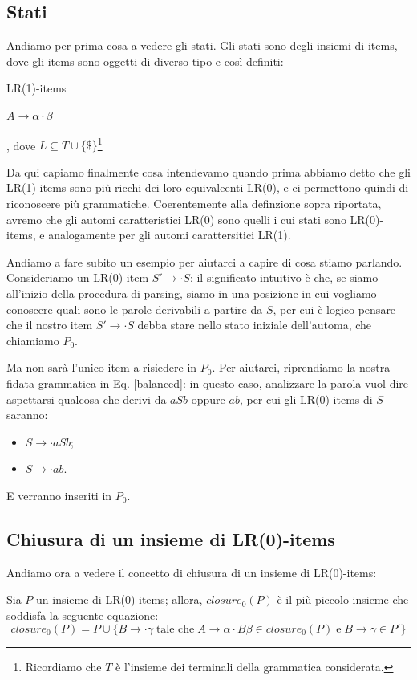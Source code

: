 \documentclass[class=book, crop=false, oneside, 12pt]{standalone}
\begin{document}
\subsection{Stati}
Andiamo per prima cosa a vedere gli stati. Gli stati sono degli insiemi di items, dove gli items sono oggetti di diverso tipo e così definiti:
\begin{labeling}{LR(1)-items}
    \item[LR(0)-items] \(A \to \alpha \cdot \beta\)
    \item[LR(1)-items] [\(A \to \alpha \cdot \beta, L\)], dove \(L \subseteq T \cup \{\$\}\)\footnote{Ricordiamo che \(T\) è l'insieme dei terminali della grammatica considerata.}
\end{labeling}
Da qui capiamo finalmente cosa intendevamo quando prima abbiamo detto che gli LR(1)-items sono più ricchi dei loro equivaleenti LR(0), e ci permettono quindi di riconoscere più grammatiche. Coerentemente alla definzione sopra riportata, avremo che gli automi caratteristici LR(0) sono quelli i cui stati sono LR(0)-items, e analogamente per gli automi carattersitici LR(1).

Andiamo a fare subito un esempio per aiutarci a capire di cosa stiamo parlando. Consideriamo un LR(0)-item \(S' \to \cdot S\): il significato intuitivo è che, se siamo all'inizio della procedura di parsing, siamo in una posizione in cui vogliamo conoscere quali sono le parole derivabili a partire da \(S\), per cui è logico pensare che il nostro item \(S' \to \cdot S\) debba stare nello stato iniziale dell'automa, che chiamiamo \(P_0\).

Ma non sarà l'unico item a risiedere in \(P_0\). Per aiutarci, riprendiamo la nostra fidata grammatica in Eq. \ref{balanced}: in questo caso, analizzare la parola vuol dire aspettarsi qualcosa che derivi da \(aSb\) oppure \(ab\), per cui gli LR(0)-items di \(S\) saranno:
\begin{itemize}
    \item \(S \to \cdot aSb\);
    \item \(S \to \cdot ab\).
\end{itemize}
E verranno inseriti in \(P_0\).

\subsection{Chiusura di un insieme di LR(0)-items}
Andiamo ora a vedere il concetto di chiusura di un insieme di LR(0)-items:

\begin{definition}
    Sia \(P\) un insieme di LR(0)-items; allora, \(closure_0(P)\) è il più piccolo insieme che soddisfa la seguente equazione:
    \begin{equation}
        closure_0(P) = P \cup \{B \to \cdot \gamma \; \textrm{tale che} \; A \to \alpha \cdot B \beta \in closure_0(P) \; \textrm{e} \; B \to \gamma \in P'\}
    \end{equation}
\end{definition}
\end{document}
